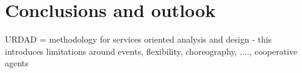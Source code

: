 \section{Conclusions and outlook \label{sec:conclusionsAndOutlook}}

URDAD = methodology for services oriented analysis and design - this introduces limitations around events, flexibility, choreography, ...., cooperative agents